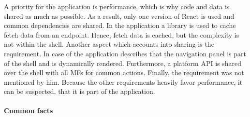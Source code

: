 A priority for the application is performance, which is why code and data is shared as much as possible.
As a result, only one version of React is used and common dependencies are shared.
In the application a library is used to cache fetch data from an endpoint.
Hence, fetch data is cached, but the complexity is not within the shell.
Another aspect which accounts into sharing is the  requirement.
In case of the application \citeauthor{Grijzen.2019} describes that the navigation panel is part of the shell and is dynamically rendered.
Furthermore, a platform \ac{API} is shared over the shell with all \acp{MF} for common actions.
Finally, the  requirement was not mentioned by him.
Because the other requirements heavily favor performance, it can be suspected, that it is part of the application.




\paragraph{Common facts}

